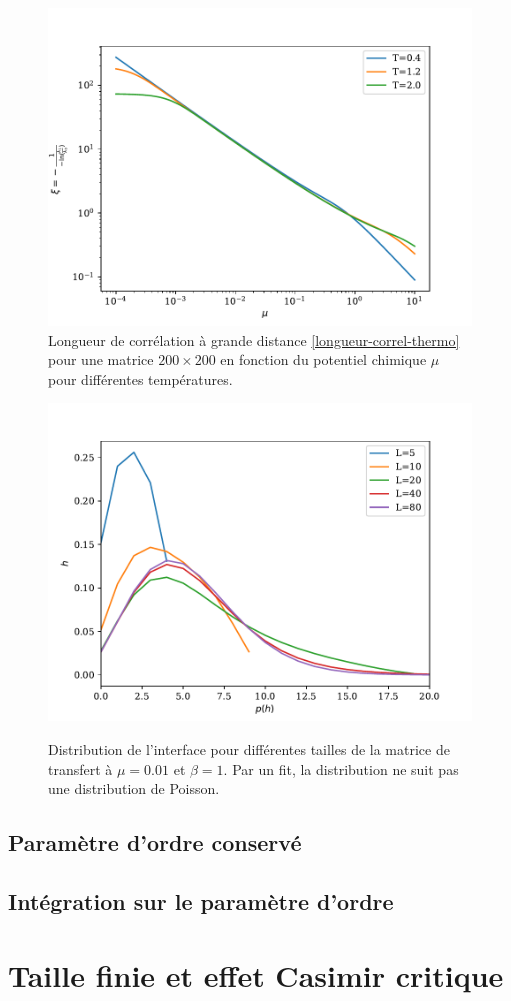 \begin{figure}
    \centering
	\includegraphics[width=0.5\linewidth]{chap4/longueur-correl.pdf}
    \caption{Longueur de corrélation à grande distance \ref{longueur-correl-thermo} pour une matrice $200\times200$ en fonction du potentiel chimique $\mu$ pour différentes températures.}
\end{figure}

\begin{figure}
    \centering
	\includegraphics[width=0.5\linewidth]{chap4/distribution-taille-finie.pdf}
	\label{distribution-taille-finie}
	\caption{Distribution de l'interface pour différentes tailles de la matrice de transfert à $\mu=0.01$ et $\beta = 1$. Par un fit, la distribution ne suit pas une distribution de Poisson.}
\end{figure}


    \subsection{Paramètre d'ordre conservé}
	
    
    \subsection{Intégration sur le paramètre d'ordre}

    \section{Taille finie et effet Casimir critique}
    \label{sec-casimir}    

